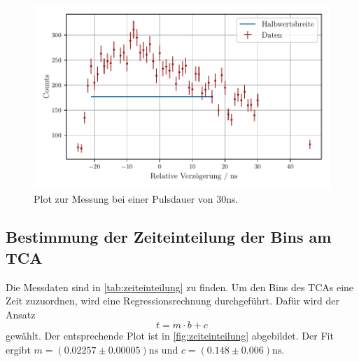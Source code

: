 \begin{figure}
    \centering
    \includegraphics[width = 0.7 \linewidth]{build/30ns_plot.pdf}
    \caption{Plot zur Messung bei einer Pulsdauer von $30$ns.}
    \label{fig:30ns_plot}
\end{figure}

\subsection{Bestimmung der Zeiteinteilung der Bins am TCA} \label{sec:zeiteinteilung}

Die Messdaten sind in \autoref{tab:zeiteinteilung} zu finden.
Um den Bins des TCAs eine Zeit zuzuordnen, wird eine Regressionsrechnung durchgeführt.
Dafür wird der Ansatz
\begin{equation*}
    t = m \cdot b + c
\end{equation*}
gewählt.
Der entsprechende Plot ist in \autoref{fig:zeiteinteilung} abgebildet.
Der Fit ergibt 
$m = (0.02257 \pm 0.00005)\unit{\nano\second}$ und $c = (0.148 \pm 0.006)\unit{\nano\second}$.


